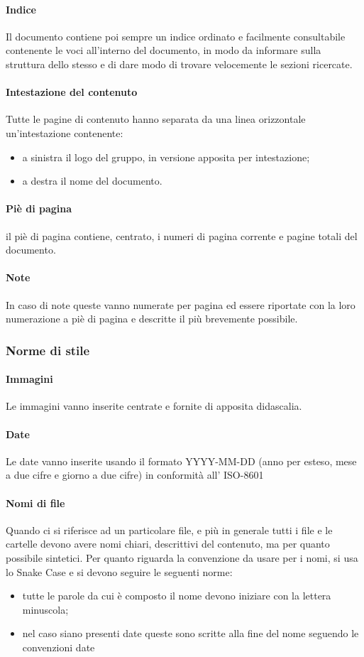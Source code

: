 	    \paragraph{Indice}
	    Il documento contiene poi sempre un indice ordinato e facilmente consultabile contenente le voci all'interno del documento, in modo da informare sulla struttura dello stesso e di dare modo di trovare velocemente le sezioni ricercate.
	    \paragraph{Intestazione del contenuto}
	    Tutte le pagine di contenuto hanno separata da una linea orizzontale un'intestazione contenente:
	    \begin{itemize}
	        \item a sinistra il logo del gruppo, in versione apposita per intestazione;
	        \item a destra il nome del documento.
	    \end{itemize}
	    \paragraph{Piè di pagina}
	    il piè di pagina contiene, centrato, i numeri di pagina corrente e pagine totali del documento.
	    \paragraph{Note}
	    In caso di note queste vanno numerate per pagina ed essere riportate con la loro numerazione a piè di pagina e descritte il più brevemente possibile.
	    \subsubsection{Norme di stile}
	    \paragraph{Immagini}
	    Le immagini vanno inserite centrate e fornite di apposita didascalia.
	    \paragraph{Date}
	    Le date vanno inserite usando il formato YYYY-MM-DD (anno per esteso, mese a due cifre e giorno a due cifre) in conformità all' ISO-8601
	    \paragraph{Nomi di file}
	    Quando ci si riferisce ad un particolare file, e più in generale tutti i file e le cartelle devono avere nomi chiari, descrittivi del contenuto, ma per quanto possibile sintetici.
	    Per quanto riguarda la convenzione da usare per i nomi, si usa lo Snake Case e si devono seguire le seguenti norme:
	    \begin{itemize}
	        \item tutte le parole da cui è composto il nome devono iniziare con la lettera minuscola;
	        \item nel caso siano presenti date queste sono scritte alla fine del nome seguendo le convenzioni date
	    \end{itemize}
